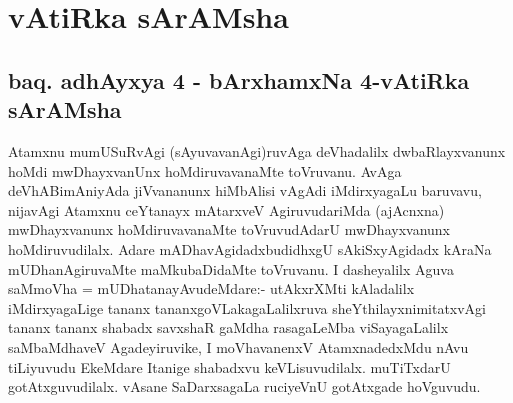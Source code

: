 \chapter{vAtiRka sArAMsha}



\section*{baq. adhAyxya 4 - bArxhamxNa 4-vAtiRka sArAMsha}


\begin{artha}
Atamxnu mumUSuRvAgi (sAyuvavanAgi)ruvAga deVhadalilx dwbaRlayxvanunx hoMdi mwDhayxvanUnx hoMdiruvavanaMte toVruvanu. AvAga deVhABimAniyAda jiVvananunx hiMbAlisi vAgAdi iMdirxyagaLu baruvavu, nijavAgi Atamxnu ceYtanayx mAtarxveV AgiruvudariMda (ajAcnxna) mwDhayxvanunx hoMdiruvavanaMte toVruvudAdarU mwDhayxvanunx hoMdiruvudilalx. Adare mADhavAgidadx\break	 budidhxgU sAkiSxyAgidadx kAraNa mUDhanAgiruvaMte maMkubaDidaMte toVruvanu. I dasheyalilx Aguva saMmoVha = mUDhatanayAvudeMdare:- utAkxrXMti kAladalilx iMdirxyagaLige tananx tananxgoVLakagaLalilxruva sheYthilayxnimitatxvAgi tananx tananx shabadx savxshaR gaMdha rasagaLeMba viSayagaLalilx saMbaMdhaveV Agadeyiruvike, I moVhavanenxV AtamxnadedxMdu nAvu tiLiyuvudu EkeMdare Itanige shabadxvu keVLisuvudilalx. muTiTxdarU gotAtxguvudilalx. vAsane SaDarxsagaLa ruciyeVnU gotAtxgade hoVguvudu.
\end{artha}

